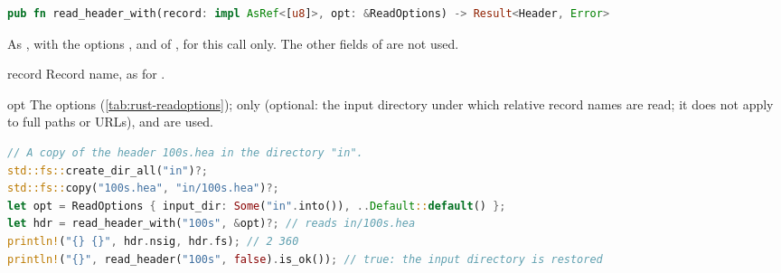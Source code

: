 \begin{lstlisting}[language=Rust,style=signature]
pub fn read_header_with(record: impl AsRef<[u8]>, opt: &ReadOptions) -> Result<Header, Error>
\end{lstlisting}
As , with the options ,  and
 of , for this call only. The other fields of  are not
used.
\begin{params}
\item[record] Record name, as for .
\item[opt] The options (\cref{tab:rust-readoptions}); only  (optional:
  the input directory under which relative record names are read; it does not apply to
  full paths or URLs),  and  are used.
\end{params}
\begin{lstlisting}[language=Rust,style=example]
// A copy of the header 100s.hea in the directory "in".
std::fs::create_dir_all("in")?;
std::fs::copy("100s.hea", "in/100s.hea")?;
let opt = ReadOptions { input_dir: Some("in".into()), ..Default::default() };
let hdr = read_header_with("100s", &opt)?; // reads in/100s.hea
println!("{} {}", hdr.nsig, hdr.fs); // 2 360
println!("{}", read_header("100s", false).is_ok()); // true: the input directory is restored
\end{lstlisting}


